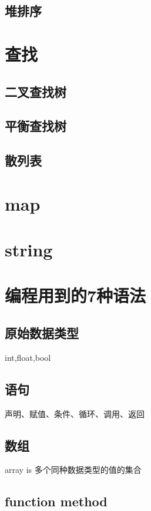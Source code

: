 \documentclass[UTF8]{ctexart}
\begin{document}
\subsection{堆排序}

\section{查找}
\subsection{二叉查找树}
\subsection{平衡查找树}
\subsection{散列表}

\section{map}

\section{string}

\section{编程用到的7种语法}
\subsection{原始数据类型}
int,float,bool
\subsection{语句}
声明、赋值、条件、循环、调用、返回
\subsection{数组}
array is 多个同种数据类型的值的集合
\subsection{function method}
\end{document}
